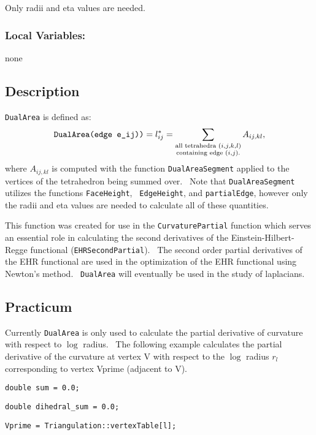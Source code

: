 \qquad Only radii and eta values are needed.

\subsubsection*{Local Variables: \ }

\qquad none

\subsection*{Description}

\texttt{DualArea} is defined as:%
\begin{equation*}
\text{\texttt{DualArea(edge e\_ij))}}=l_{ij}^{\ast }=\sum_{\substack{ \text{%
all tetrahedra }(i,j,k,l) \\ \text{containing edge }(i,j)\text{.}}}A_{ij,kl},
\end{equation*}%
where $A_{ij,kl}$ is computed with the function \texttt{DualAreaSegment}
applied to the vertices of the tetrahedron being summed over. \ Note that 
\texttt{DualAreaSegment} utilizes the functions \texttt{FaceHeight}, \texttt{%
EdgeHeight}, and \texttt{partialEdge}, however only the radii and eta values
are needed to calculate all of these quantities. \ 

This function was created for use in the \texttt{CurvaturePartial} function
which serves an essential role in calculating the second derivatives of the
Einstein-Hilbert-Regge functional (\texttt{EHRSecondPartial}). \ The second
order partial derivatives of the EHR functional are used in the optimization
of the EHR functional using Newton's method. \ \texttt{DualArea} will
eventually be used in the study of laplacians. \ 

\subsection*{Practicum}

Currently \texttt{DualArea} is only used to calculate the partial derivative
of curvature with respect to $\log $ radius. \ The following example
calculates the partial derivative of the curvature at vertex V with respect
to the $\log $ radius $r_{l}$ corresponding to vertex Vprime (adjacent to V).

\bigskip

\qquad\texttt{double sum = 0.0;}

\qquad\texttt{double dihedral\_sum = 0.0;}

\qquad\texttt{Vprime = Triangulation::vertexTable[l];}

